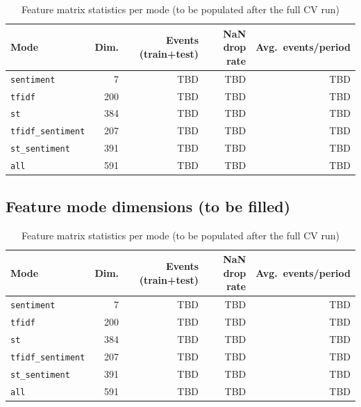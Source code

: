 \documentclass{article}
\begin{document}
\begin{table}[H]
\centering
\caption{Key parameters in \texttt{run\_pipeline\_config.json}}
\label{tab:config}
\begin{table}[H]
\centering
\caption{Feature matrix statistics per mode (to be populated after the full CV run)}
\label{tab:feature_dims}
\begin{tabular}{lrrrr}
\toprule
\textbf{Mode} & \textbf{Dim.} & \textbf{Events (train+test)} & \textbf{NaN drop rate} & \textbf{Avg.\ events/period} \\
\midrule
\texttt{sentiment}        & 7   & TBD & TBD & TBD \\
\texttt{tfidf}            & 200 & TBD & TBD & TBD \\
\texttt{st}               & 384 & TBD & TBD & TBD \\
\texttt{tfidf\_sentiment} & 207 & TBD & TBD & TBD \\
\texttt{st\_sentiment}    & 391 & TBD & TBD & TBD \\
\texttt{all}              & 591 & TBD & TBD & TBD \\
\bottomrule
\end{tabular}
\end{table}
\end{table}

\subsection{Feature mode dimensions (to be filled)}

\begin{table}[H]
\centering
\caption{Feature matrix statistics per mode (to be populated after the full CV run)}
\label{tab:feature_dims}
\begin{tabular}{lrrrr}
\toprule
\textbf{Mode} & \textbf{Dim.} & \textbf{Events (train+test)} & \textbf{NaN drop rate} & \textbf{Avg.\ events/period} \\
\midrule
\texttt{sentiment}        & 7   & TBD & TBD & TBD \\
\texttt{tfidf}            & 200 & TBD & TBD & TBD \\
\texttt{st}               & 384 & TBD & TBD & TBD \\
\texttt{tfidf\_sentiment} & 207 & TBD & TBD & TBD \\
\texttt{st\_sentiment}    & 391 & TBD & TBD & TBD \\
\texttt{all}              & 591 & TBD & TBD & TBD \\
\bottomrule
\end{tabular}
\end{table}
\end{document}
